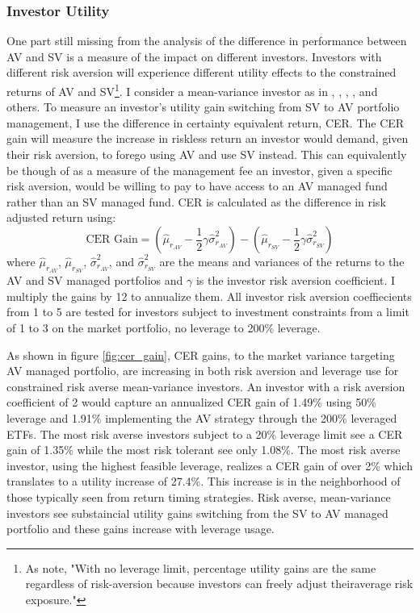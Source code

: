 \subsubsection{Investor Utility}

One part still missing from the analysis of the difference in performance between AV and SV is a measure of the impact on different investors. Investors with different risk aversion will experience different utility effects to the constrained returns of AV and SV\footnote{As \citet{moreira_volatility-managed_2017} note, "With no leverage limit, percentage utility gains are the same regardless of risk-aversion because investors can freely adjust theiraverage risk exposure."}. I consider a mean-variance investor as in \cite{Kandel1996}, \cite{Campbell2008}, \cite{Ferreira2011}, \cite{Rapach2016}, and others. To measure an investor's utility gain switching from SV to AV portfolio management, I use the difference in certainty equivalent return, CER. The CER gain will measure the increase in riskless return an investor would demand, given their risk aversion, to forego using AV and use SV instead. This can equivalently be though of as a measure of the management fee an investor, given a specific risk aversion, would be willing to pay to have access to an AV managed fund rather than an SV managed fund. CER is calculated as the difference in risk adjusted return using:
\begin{equation}
\text{CER Gain} = \left(\hat \mu_{r_{AV}} - \frac{1}{2}\gamma\hat \sigma^{2}_{r_{AV}}\right) - \left(\hat \mu_{r_{SV}} - \frac{1}{2}\gamma\hat \sigma^{2}_{r_{SV}}\right)
\end{equation}
where $\hat \mu_{r_{AV}}$, $\hat \mu_{r_{SV}}$, $\hat \sigma^{2}_{r_{AV}}$, and $\hat \sigma^{2}_{r_{SV}}$ are the means and
variances of the returns to the AV and SV managed portfolios and $\gamma$ is the investor risk aversion coefficient. I multiply the gains by 12 to annualize them. All investor risk aversion coeffiecients from 1 to 5 are tested for investors subject to investment constraints from a limit of 1 to 3 on the market portfolio, no leverage to 200\% leverage.

As shown in figure \ref{fig:cer_gain}, CER gains, to the market variance targeting AV managed portfolio, are increasing in both risk aversion and leverage use for constrained risk averse mean-variance investors. An investor with a risk aversion coefficient of 2 would capture an annualized CER gain of 1.49\% using 50\% leverage and 1.91\% implementing the AV strategy through the 200\% leveraged ETFs. The most risk averse investors subject to a 20\% leverage limit see a CER gain of 1.35\% while the most risk tolerant see only 1.08\%. The most risk averse investor, using the highest feasible leverage, realizes a CER gain of over 2\% which translates to a utility increase of 27.4\%. This increase is in the neighborhood of those typically seen from return timing strategies. \citep{campbell1997econometrics,moreira_volatility-managed_2017} Risk averse, mean-variance investors see substaincial utility gains switching from the SV to AV managed portfolio and these gains increase with leverage usage.
